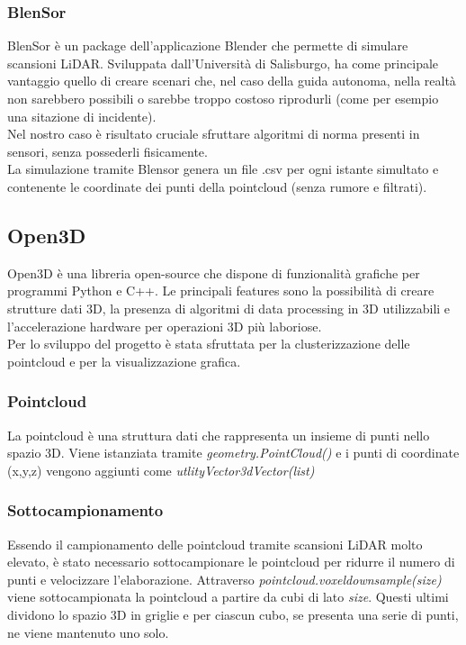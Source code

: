 \documentclass[italian]{article}
\begin{document}
\subsubsection{BlenSor}
BlenSor è un package dell'applicazione Blender che permette di simulare scansioni LiDAR. Sviluppata dall'Università di Salisburgo, ha come principale vantaggio quello di creare scenari che, nel caso della guida autonoma, nella realtà non sarebbero possibili o sarebbe troppo costoso riprodurli (come per esempio una sitazione di incidente).\\
Nel nostro caso è risultato cruciale sfruttare algoritmi di norma presenti in sensori, senza possederli fisicamente.\\
La simulazione tramite Blensor genera un file .csv per ogni istante simultato e contenente le coordinate dei punti della pointcloud (senza rumore e filtrati).%
\subsection{Open3D}
Open3D è una libreria open-source che dispone di funzionalità grafiche per programmi Python e C++. Le principali features sono la possibilità di creare strutture dati 3D, la presenza di algoritmi di data processing in 3D utilizzabili e l'accelerazione hardware per operazioni 3D più laboriose.\\
Per lo sviluppo del progetto è stata sfruttata per la clusterizzazione delle pointcloud e per la visualizzazione grafica.
\subsubsection{Pointcloud}
La pointcloud è una struttura dati che rappresenta un insieme di punti nello spazio 3D. Viene istanziata tramite \textit{geometry.PointCloud()} e i punti di coordinate (x,y,z) vengono aggiunti come \textit{utlityVector3dVector(list)}\\
\subsubsection*{Sottocampionamento}
Essendo il campionamento delle pointcloud tramite scansioni LiDAR molto elevato, è stato necessario sottocampionare le pointcloud per ridurre il numero di punti e velocizzare l'elaborazione. Attraverso \textit{pointcloud.voxeldownsample(size)}  viene sottocampionata la pointcloud a partire da cubi di lato \textit{size}. Questi ultimi dividono lo spazio 3D in griglie e per ciascun cubo, se presenta una serie di punti, ne viene mantenuto uno solo.
\end{document}
